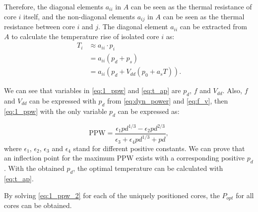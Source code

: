 Therefore, the diagonal elements $a_{ii}$ in $A$ can be seen as the thermal resistance of core $i$ itself, and the non-diagonal elements $a_{ij}$ in $A$ can be seen as the thermal resistance between core $i$ and $j$. The diagonal element $a_{ii}$ can be extracted from $A$ to calculate the temperature rise of isolated core $i$ as:
\begin{equation}\label{eq:t_ap}
\begin{split}
T_{i}&\approx a_{ii} \cdot p_{i}\\
&=a_{ii}(p_{d}+p_{s})\\
&=a_{ii}(p_{d}+V_{dd} (p_{0}+a_{s}T)).
\end{split}
\end{equation}

We can see that variables in \eqref{eq:1_ppw} and \eqref{eq:t_ap} are $p_{d}$, $f$ and $V_{dd}$. Also, $f$ and $V_{dd}$ can be expressed with $p_{d}$ from \eqref{eq:dyn_power} and \eqref{eq:f_v}, then \eqref{eq:1_ppw} with the only variable $p_{d}$ can be expressed as:

\begin{equation}\label{eq:1_ppw_2}
\text{PPW} = \frac{\epsilon_{1}pd^{1/3}-\epsilon_{2}pd^{2/3}}{\epsilon_{3}+\epsilon_{4}pd^{1/3}+pd},
\end{equation}
where $\epsilon_{1}$, $\epsilon_{2}$, $\epsilon_{3}$ and $\epsilon_{4}$ stand for different positive constants. We can prove that an inflection point for the maximum $\text{PPW}$ exists with a corresponding positive $p_{d}$. 
With the obtained $p_{d}$, the optimal temperature can be calculated with \eqref{eq:t_ap}.

By solving \eqref{eq:1_ppw_2} for each of the uniquely positioned cores, the $P_{opt}$ for all cores can be obtained.

